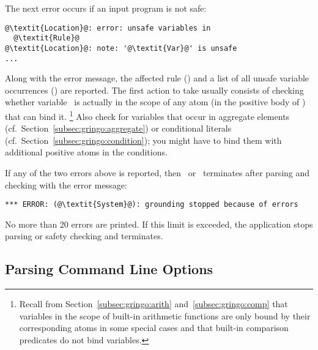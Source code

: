 The next error occurs if an input program is not safe:
%
\begin{lstlisting}[numbers=none,escapechar=@]
@\textit{Location}@: error: unsafe variables in
  @\textit{Rule}@
@\textit{Location}@: note: '@\textit{Var}@' is unsafe
...
\end{lstlisting}
%
Along with the error message,
the affected rule () and a list of all unsafe variable occurrences () are reported.
The first action to take usually consists of checking whether
variable~ is actually in the scope of any atom
(in the positive body of ) that can bind it.%
\footnote{%
  Recall from Section~\ref{subsec:gringo:arith} and~\ref{subsec:gringo:comp}
  that variables in the scope of built-in arithmetic functions are only bound by their corresponding atoms in some special cases 
  and that built-in comparison predicates do not bind variables.}
Also check for variables that occur in aggregate elements (cf.\ Section~\ref{subsec:gringo:aggregate}) or conditional literals (cf.\ Section~\ref{subsec:gringo:condition});
you might have to bind them with additional positive atoms in the conditions.

If any of the two errors above is reported,
then \gringo\ or \clingo\ terminates after parsing and checking with the error message:
\begin{lstlisting}[numbers=none,escapechar=@]
*** ERROR: (@\textit{System}@): grounding stopped because of errors
\end{lstlisting}

\begin{note}
No more than 20 errors are printed.
If this limit is exceeded, the application stops parsing or safety checking and terminates.
\end{note}

\subsection{Parsing Command Line Options}\label{subsec:error:options}

